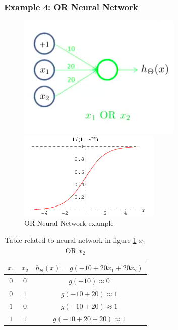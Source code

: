 \newpage
\begin{mdframed}[style=MyFrame]
\subsubsection{Example 4:  OR Neural Network}

\begin{figure}[H]
	\centering
	\begin{minipage}[c]{.46\textwidth}
		\centering
		\includegraphics[scale=0.35]{images/or}		
	\end{minipage}%
	\hspace{4mm}%
	\begin{minipage}[c]{.46\textwidth}
		\centering
		\includegraphics[scale=0.55]{images/sigmoidplot}
	\end{minipage}
	\caption{OR Neural Network example}\label{fig:notx1andnotx2}
	 \label{fig:or}%
\end{figure}




\begin{table}[H]
\caption{Table related to neural network in figure \ref{fig:or} $x_1$ OR  $x_2$ }
\centering
\begin{tabular}{c c c }
\hline\hline
$x_1$	&	$x_2$ & $h_{\Theta}(x) = g(-10 + 20x_1 + 20x_2 )$  \\ [0.5ex] %
\hline
$0$ &	$0$	& $g(-10) \approx 0$ \\
$0$ &	$1$	& $g(-10 + 20) \approx 1$ \\
$1$ &	$0$	& $g(-10 + 20) \approx 1$ \\
$1$ &	$1$	& $g(-10 + 20 + 20) \approx 1$ \\
\hline
\end{tabular}
\label{table:nov-ser}
\end{table}
\end{mdframed}



